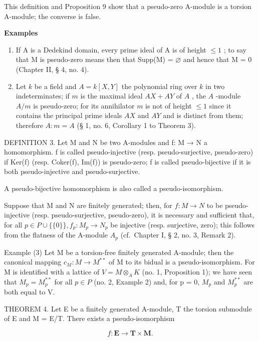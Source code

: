 This definition and Proposition 9 show that a pseudo-zero A-module is a torsion A-module; the converse is false.

\textbf{Examples}\par

\begin{enumerate}
\def\labelenumi{(\arabic{enumi})}
\item
  If A is a Dedekind domain, every prime ideal of A is of height \(\leqslant1\) ; to say that M is pseudo-zero means then that Supp(M) = \(\varnothing\) and hence that M = 0 (Chapter II, § 4, no. 4).
\item
  Let \(k\) be a field and \(A = k[X, Y]\) the polynomial ring over \(k\) in two indeterminates; if \(m\) is the maximal ideal \(AX + AY\) of \(A\) , the \(A\) -module \(A/m\) is pseudo-zero; for its annihilator \(m\) is not of height \(\leqslant 1\) since it contains the principal prime ideals \(AX\) and \(AY\) and is distinct from them; therefore \(A: m = A\) (§ 1, no. 6, Corollary 1 to Theorem 3).
\end{enumerate}

DEFINITION 3. Let M and N be two A-modules and f: M → N a homomorphism. f is called pseudo-injective (resp. pseudo-surjective, pseudo-zero) if Ker(f) (resp. Coker(f), Im(f)) is pseudo-zero; f is called pseudo-bijective if it is both pseudo-injective and pseudo-surjective.

A pseudo-bijective homomorphism is also called a pseudo-isomorphism.

Suppose that M and N are finitely generated; then, for \(f: M \to N\) to be pseudo-injective (resp. pseudo-surjective, pseudo-zero), it is necessary and sufficient that, for all \(p \in P \cup \{\{0\}\}, f_{p}: M_{p} \to N_{p}\) be injective (resp. surjective, zero); this follows from the flatness of the A-module \(A_{p}\) (cf.~Chapter I, § 2, no. 3, Remark 2).

Example (3) Let M be a torsion-free finitely generated A-module; then the canonical mapping \(c_{M}: M \to M^{**}\) of M to its bidual is a pseudo-isomorphism. For M is identified with a lattice of \(V = M \otimes_{A} K\) (no. 1, Proposition 1); we have seen that \(M_{p} = M_{p}^{**}\) for all \(p \in P\) (no. 2, Example 2) and, for p = 0, \(M_{p}\) and \(M_{p}^{**}\) are both equal to V.

THEOREM 4. Let E be a finitely generated A-module, T the torsion submodule of E and M = E/T. There exists a pseudo-isomorphism

\[
f \colon \mathbf {E} \rightarrow \mathbf {T} \times \mathbf {M}.
\]

